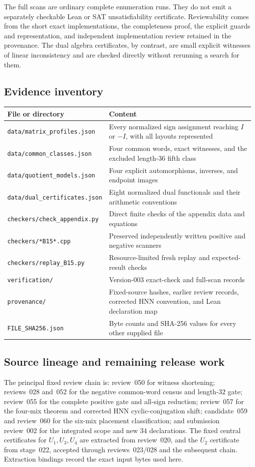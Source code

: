 \documentclass[11pt,a4paper]{article}
\theoremstyle{definition}\newtheorem{definition}[theorem]{Definition}
\theoremstyle{remark}\newtheorem{remark}[theorem]{Remark}
\newcommand{\pathfile}[1]{\nolinkurl{#1}}
\begin{document}
The full scans are ordinary complete enumeration runs. They do not emit a separately checkable Lean or SAT unsatisfiability certificate. Reviewability comes from the short exact implementations, the completeness proof, the explicit guards and representation, and independent implementation review retained in the provenance. The dual algebra certificates, by contrast, are small explicit witnesses of linear inconsistency and are checked directly without rerunning a search for them.

\subsection{Evidence inventory}
\begin{longtable}{p{.43\linewidth}p{.48\linewidth}}
\toprule File or directory & Content\\\midrule\endhead
\pathfile{data/matrix_profiles.json} & Every normalized sign assignment reaching $I$ or $-I$, with all layouts represented\\
\pathfile{data/common_classes.json} & Four common words, exact witnesses, and the excluded length-$36$ fifth class\\
\pathfile{data/quotient_models.json} & Four explicit automorphisms, inverses, and endpoint images\\
\pathfile{data/dual_certificates.json} & Eight normalized dual functionals and their arithmetic conventions\\
\pathfile{checkers/check_appendix.py} & Direct finite checks of the appendix data and equations\\
\pathfile{checkers/*B15*.cpp} & Preserved independently written positive and negative scanners\\
\pathfile{checkers/replay_B15.py} & Resource-limited fresh replay and expected-result checks\\
\pathfile{verification/} & Version-003 exact-check and full-scan records\\
\pathfile{provenance/} & Fixed-source hashes, earlier review records, corrected HNN convention, and Lean declaration map\\
\pathfile{FILE_SHA256.json} & Byte counts and SHA-256 values for every other supplied file\\\bottomrule
\end{longtable}

\subsection{Source lineage and remaining release work}
The principal fixed review chain is: review~050 for witness shortening; reviews~028 and~052 for the negative common-word census and length-$32$ gate; review~055 for the complete positive gate and all-sign reduction; review~057 for the four-mix theorem and corrected HNN cyclic-conjugation shift; candidate~059 and review~060 for the six-mix placement classification; and submission review~002 for the integrated scope and new $34$ declarations. The fixed central certificates for $U_1,U_3,U_4$ are extracted from review~020, and the $U_2$ certificate from stage~022, accepted through reviews~023/028 and the subsequent chain. Extraction bindings record the exact input bytes used here.
\end{document}
